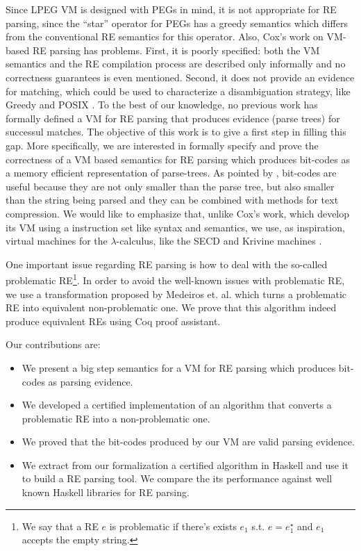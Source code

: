 Since LPEG VM is designed with PEGs in mind, it is not appropriate for RE parsing, since the ``star''
operator for PEGs has a greedy semantics which differs from the conventional RE semantics for this operator. 
Also, Cox's work on VM-based RE parsing has problems. First, it is poorly specified: both the VM semantics 
and the RE compilation process are described only informally and no correctness guarantees is even mentioned. 
Second, it does not provide an evidence for matching, which could be used to characterize a disambiguation 
strategy, like Greedy \cite{Frisch2004} and POSIX \cite{Sulzmann14}. To the best of our knowledge, no 
previous work has formally defined a VM for RE parsing that produces evidence (parse trees) for successul matches.
The objective of this work is to give a first step in filling this gap. More specifically, we are interested in formally
specify and prove the correctness of a VM based semantics for RE parsing which produces bit-codes as
a memory efficient representation of parse-trees. As pointed by \cite{Lasse2011}, bit-codes are useful because they
are not only smaller than the parse tree, but also smaller than the string being parsed and they can be combined with methods
for text compression. We would like to emphasize that, unlike Cox's work, which develop its VM using a instruction 
set like syntax and semantics, we use, as inspiration, virtual machines for the $\lambda$-calculus, like the 
SECD and Krivine machines \cite{Krivine07,Landin64}. 


One important issue regarding RE parsing is how to deal with the so-called problematic 
RE\footnote{We say that a RE $e$ is problematic if there's exists $e_1$ s.t. $e = e_1^\star$ and 
$e_1$ accepts the empty string.}\cite{Frisch2004}. In order to avoid the well-known issues with 
problematic RE, we use a transformation proposed by Medeiros et. al.\cite{Medeiros14} which turns a
problematic RE into equivalent non-problematic one. We prove that this algorithm indeed produce
equivalent REs using Coq proof assistant.


Our contributions are:



\begin{itemize}
\item  We present a big step semantics for a VM for RE parsing which produces bit-codes as parsing evidence.



\item  We developed a certified implementation of an algorithm that converts a problematic RE into a 
  non-problematic one.



\item  We proved that the bit-codes produced by our VM are valid parsing evidence.



\item  We extract from our formalization a certified algorithm in Haskell and use it 
  to build a RE parsing tool. We compare the its performance against 
  well known Haskell libraries for RE parsing.  

\end{itemize}


